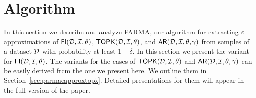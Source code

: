\section{Algorithm}
\label{sec:parmaparmaalgo}
In this section we describe and analyze PARMA, our algorithm for extracting
$\varepsilon$-approximations of $\mathsf{FI}({\cal D},{\cal I},\theta)$,
$\mathsf{TOPK}({\cal D},{\cal I},\theta)$, and $\mathsf{AR}({\cal D},{\cal I},\theta,\gamma)$ from samples of a dataset
${\cal D}$ with probability at least $1-\delta$. In this section we present the
variant for $\mathsf{FI}({\cal D},{\cal I},\theta)$. The variants for the cases of $\mathsf{TOPK}({\cal D},{\cal I},\theta)$ and
$\mathsf{AR}({\cal D},{\cal I},\theta,\gamma)$ can be easily derived from the one
we present here. We outline them in Section~\ref{sec:parmaeapproxtopk}. Detailed
presentations for them will appear in the full version of the paper.

